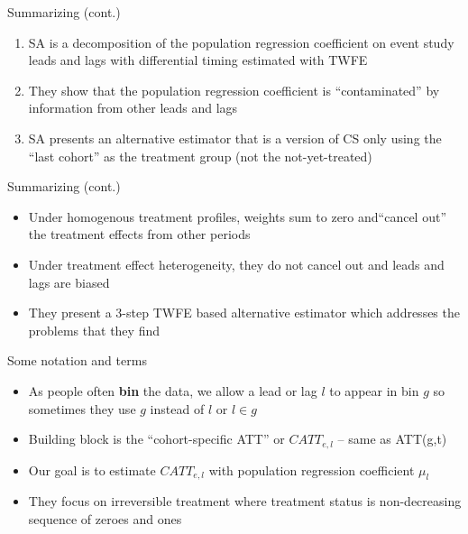 \documentclass{beamer}
\begin{document}
\begin{frame}{Summarizing (cont.)}

	\begin{enumerate}
	\item SA is a decomposition of the population regression coefficient on event study leads and lags with differential timing estimated with TWFE
	\item They show that the population regression coefficient is ``contaminated'' by information from other leads and lags
	\item SA presents an alternative estimator that is a version of CS only using the ``last cohort'' as the treatment group (not the not-yet-treated)
	\end{enumerate}

\end{frame}

\begin{frame}{Summarizing (cont.)}

\begin{itemize}
\item Under homogenous treatment profiles, weights sum to zero and``cancel out'' the treatment effects from other periods 
\item Under treatment effect heterogeneity, they do not cancel out and leads and lags are biased
\item They present a 3-step TWFE based alternative estimator which addresses the problems that they find
\end{itemize}

\end{frame}


\begin{frame}{Some notation and terms}

\begin{itemize}
\item As people often \textbf{bin} the data, we allow a lead or lag $l$ to appear in bin $g$ so sometimes they use $g$ instead of $l$ or $l \in g$
\item Building block is the ``cohort-specific ATT'' or $CATT_{e,l}$ -- same as ATT(g,t)
\item Our goal is to estimate $CATT_{e,l}$ with population regression coefficient $\mu_l$
\item They focus on irreversible treatment where treatment status is non-decreasing sequence of zeroes and ones
\end{itemize}

\end{frame}
\end{document}
